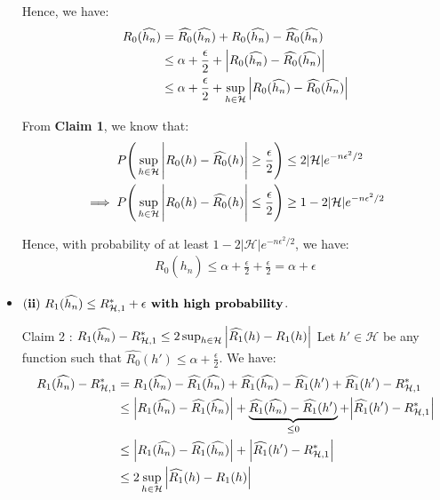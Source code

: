\begin{solution*}
\begin{itemize}
\noindent Hence, we have:
\begin{align*}
    R_0(\widehat{h_n})
        &= \widehat{R_0}(\widehat{h_n}) + R_0(\widehat{h_n}) - \widehat{R_0}(\widehat{h_n}) \\
        &\le \alpha + \frac{\epsilon}{2} + \Big| R_0(\widehat{h_n}) - \widehat{R_0}(\widehat{h_n}) \Big| \\
        &\le \alpha + \frac{\epsilon}{2} + \sup_{h\in\mathcal{H}}\Big| 
            R_0(\widehat{h_n}) - \widehat{R_0}(\widehat{h_n})
         \Big|
\end{align*}

\noindent From \textbf{Claim 1}, we know that:
\begin{align*}
    P\Bigg( 
        \sup_{h\in\mathcal{H}} \Bigg| 
            R_0(h) - \widehat{R_0}(h)
         \Bigg| \ge\frac{\epsilon}{2}
     \Bigg) &\le 2|\mathcal{H}|e^{-n\epsilon^2/2} \\
    \implies
    P\Bigg( 
        \sup_{h\in\mathcal{H}} \Bigg| 
            R_0(h) - \widehat{R_0}(h)
         \Bigg| \le\frac{\epsilon}{2}
     \Bigg) &\ge 1 - 2|\mathcal{H}|e^{-n\epsilon^2/2} 
\end{align*}

\noindent Hence, with probability of at least $1 - 2|\mathcal{H}|e^{-n\epsilon^2/2}$, we have:
\begin{align*}
    R_0(\widehat{h_n}) \le \alpha + \frac{\epsilon}{2} + \frac{\epsilon}{2} = \alpha + \epsilon
\end{align*}

\item ${\bf (ii)} \ R_1(\widehat{h_n}) \le R_{\mathcal{H}, 1}^* + \epsilon \textbf{ with high probability}$.

\begin{subproof}{\newline Claim 2 : $R_1(\widehat{h_n}) - R_{\mathcal{H},1}^* \le 2\sup_{h\in\mathcal{H}}\Big| \widehat{R_1}(h) - R_1(h) \Big|$}
    Let $h' \in \mathcal{H}$ be any function such that $\widehat{R_0}(h') \le \alpha + \frac{\epsilon}{2}$. We have:
    \begin{align*}
        R_1(\widehat{h_n}) - R^*_{\mathcal{H},1}
            &= R_1(\widehat{h_n}) - \widehat{R_1}(\widehat{h_n}) 
             + \widehat{R_1}(\widehat{h_n}) - \widehat{R_1}(h')
             + \widehat{R_1}(h') - R^*_{\mathcal{H}, 1} \\
            &\le \Big| R_1(\widehat{h_n}) - \widehat{R_1}(\widehat{h_n}) \Big|
                + \underbrace{\widehat{R_1}(\widehat{h_n}) - \widehat{R_1}(h')}_{\le 0}
                + \Big| \widehat{R_1}(h') - R^*_{\mathcal{H}, 1} \Big| \\
            &\le \Big| R_1(\widehat{h_n}) - \widehat{R_1}(\widehat{h_n}) \Big|
            + \Big| \widehat{R_1}(h') - R^*_{\mathcal{H}, 1} \Big| \\
            &\le 2\sup_{h\in\mathcal{H}} \Big| 
                \widehat{R_1}(h) - R_1(h) 
             \Big|
    \end{align*}
\end{subproof}


\end{itemize}
\end{solution*}
